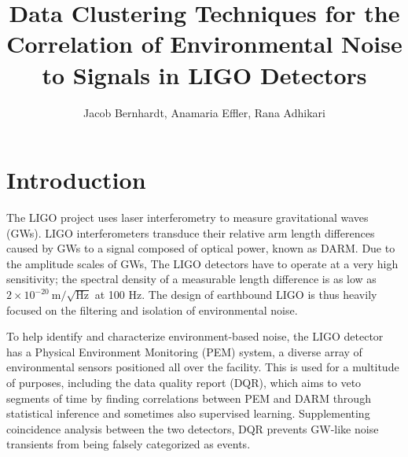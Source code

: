 \documentclass[colorlinks=true,pdfstartview=FitV,linkcolor=blue,
            citecolor=red,urlcolor=magenta]{ligodoc}
\title{Data Clustering Techniques for the Correlation of Environmental Noise to Signals in LIGO Detectors}
\author{Jacob Bernhardt, Anamaria Effler, Rana Adhikari}
\begin{document}
\section{Introduction}
The LIGO project uses laser interferometry to measure gravitational waves (GWs).
LIGO interferometers transduce their relative arm length differences caused by GWs to a signal composed of optical power, known as DARM.
Due to the amplitude scales of GWs, The LIGO detectors have to operate at a very high sensitivity; the spectral density of a measurable length difference is as low as $2\times 10^{-20}~\mathrm{m}/\sqrt{\mathrm{Hz}}$ at 100 Hz.
The design of earthbound LIGO is thus heavily focused on the filtering and isolation of environmental noise.

To help identify and characterize environment-based noise, the LIGO detector has a Physical Environment Monitoring (PEM) system, a diverse array of environmental sensors positioned all over the facility\cite{aepaper}.
This is used for a multitude of purposes, including the data quality report (DQR), which aims to veto segments of time by finding correlations between PEM and DARM through statistical inference and sometimes also supervised learning.
Supplementing coincidence analysis between the two detectors, DQR prevents GW-like noise transients from being falsely categorized as events.
\end{document}
